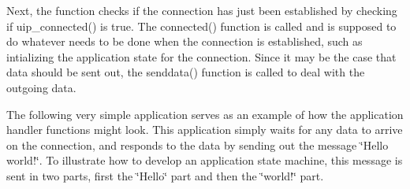 Next, the function checks if the connection has just been established by checking if uip\+\_\+connected() is true. The connected() function is called and is supposed to do whatever needs to be done when the connection is established, such as intializing the application state for the connection. Since it may be the case that data should be sent out, the senddata() function is called to deal with the outgoing data.

The following very simple application serves as an example of how the application handler functions might look. This application simply waits for any data to arrive on the connection, and responds to the data by sending out the message \char`\"{}\+Hello world!\char`\"{}. To illustrate how to develop an application state machine, this message is sent in two parts, first the \char`\"{}\+Hello\char`\"{} part and then the \char`\"{}world!\char`\"{} part.


